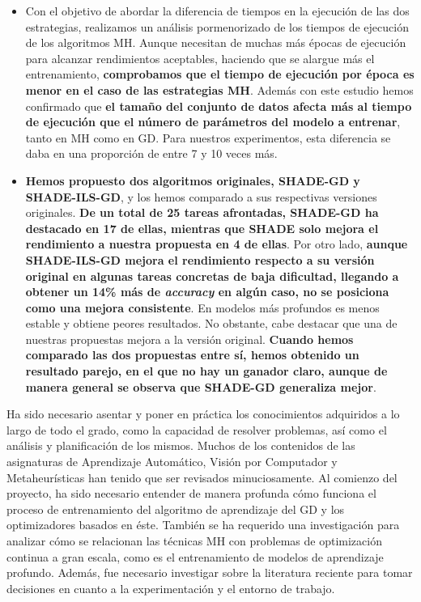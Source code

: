 \begin{itemize}
\item Con el objetivo de abordar la diferencia de tiempos en la ejecución de las dos estrategias, realizamos un análisis pormenorizado de los tiempos de ejecución de los algoritmos MH. Aunque necesitan de muchas más épocas de ejecución para alcanzar rendimientos aceptables, haciendo que se alargue más el entrenamiento, \textbf{comprobamos que el tiempo de ejecución por época es menor en el caso de las estrategias MH}. Además con este estudio hemos confirmado que \textbf{el tamaño del conjunto de datos afecta más al tiempo de ejecución que el número de parámetros del modelo a entrenar}, tanto en MH como en GD. Para nuestros experimentos, esta diferencia se daba en una proporción de entre 7 y 10 veces más.

\item \textbf{Hemos propuesto dos algoritmos originales, SHADE-GD y SHADE-ILS-GD}, y los hemos comparado a sus respectivas versiones originales. \textbf{De un total de 25 tareas afrontadas, SHADE-GD ha destacado en 17 de ellas, mientras que SHADE solo mejora el rendimiento a nuestra propuesta en 4 de ellas}. Por otro lado, \textbf{aunque SHADE-ILS-GD mejora el rendimiento respecto a su versión original en algunas tareas concretas de baja dificultad, llegando a obtener un 14\% más de \textit{accuracy} en algún caso, no se posiciona como una mejora consistente}. En modelos más profundos es menos estable y obtiene peores resultados. No obstante, cabe destacar que una de nuestras propuestas mejora a la versión original. \textbf{Cuando hemos comparado las dos propuestas entre sí, hemos obtenido un resultado parejo, en el que no hay un ganador claro, aunque de manera general se observa que SHADE-GD generaliza mejor}.

\end{itemize}

Ha sido necesario asentar y poner en práctica los conocimientos adquiridos a lo largo de todo el grado, como la capacidad de resolver problemas, así como el análisis y planificación de los mismos. Muchos de los contenidos de las asignaturas de Aprendizaje Automático, Visión por Computador y Metaheurísticas han tenido que ser revisados minuciosamente. Al comienzo del proyecto, ha sido necesario entender de manera profunda cómo funciona el proceso de entrenamiento del algoritmo de aprendizaje del GD y los optimizadores basados en éste. También se ha requerido una investigación para analizar cómo se relacionan las técnicas MH con problemas de optimización continua a gran escala, como es el entrenamiento de modelos de aprendizaje profundo. Además, fue necesario investigar sobre la literatura reciente para tomar decisiones en cuanto a la experimentación y el entorno de trabajo.

